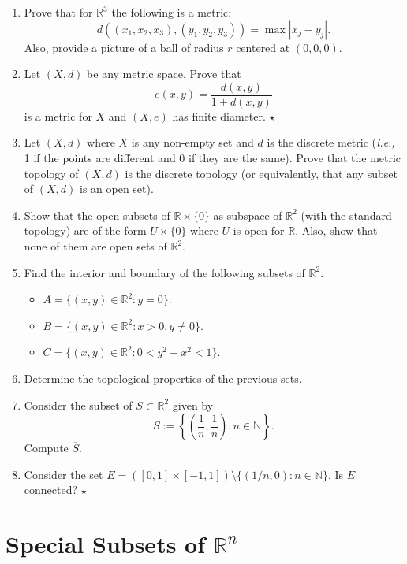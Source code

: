 \documentclass[
	fontsize=10pt, %
	twoside=false, %
	secnumdepth=1, %
]{kaobook}
\begin{document}
\begin{enumerate}

\item Prove that for $\mathbb{R}^3$ the following is a metric: $$d((x_1,x_2,x_3),(y_1,y_2,y_3))=\max |x_j-y_j|.$$ Also, provide a picture of a ball of radius $r$ centered at $(0,0,0).$

\item Let $(X,d)$ be any metric space. Prove that $$e(x,y)=\frac{d(x,y)}{1+d(x,y)}$$ is a metric for $X$ and $(X,e)$ has finite diameter. $\star$

\item Let $(X,d)$ where $X$ is any non-empty set and $d$ is the discrete metric (\emph{i.e.,} 1 if the points are different and 0 if they are the same). Prove that the metric topology of $(X,d)$ is the discrete topology (or equivalently, that any subset of $(X,d)$ is an open set).

\item Show that the open subsets of $\mathbb{R}\times\{0\}$ as subspace of $\mathbb{R}^2$ (with the standard topology) are of the form $U\times \{0\}$ where $U$ is open for $\mathbb{R}.$ Also, show that none of them are open sets of $\mathbb{R}^2.$

\item Find the interior and boundary of the following subsets of $\mathbb{R}^2.$
\begin{itemize}
\item $A=\{(x,y)\in\mathbb{R}^2: y=0\}.$
\item $B=\{(x,y)\in\mathbb{R}^2: x>0, y\neq 0\}.$
\item $C=\{(x,y)\in\mathbb{R}^2: 0<y^2-x^2<1\}.$
\end{itemize}

\item Determine the topological properties of the previous sets.

\item Consider the subset of $S\subset\mathbb{R}^2$ given by $$S:=\left\{\left(\frac{1}{n},\frac{1}{n}\right):n\in\mathbb{N}\right\}.$$ Compute $\overline{S}.$

\item Consider the set $E=([0,1]\times[-1,1]) \setminus \{(1/n,0): n\in\mathbb{N}\}.$ Is $E$ connected? $\star$

\end{enumerate}

\section{Special Subsets of $\mathbb{R}^n$}
\end{document}
